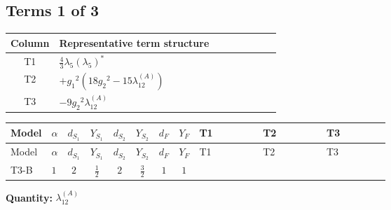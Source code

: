 \documentclass[8pt]{article}
\begin{document}
\begin{landscape}
\subsection*{Terms 1 of 3}
\begin{center}
\begin{tabular}{@{}c >{\raggedright\arraybackslash}p{0.82\linewidth}@{}}
\toprule
Column & Representative term structure \\
\midrule
T1 & \(\displaystyle \frac{4}{3} {\lambda_5} \left({\lambda_5}\right)^{*}\) \\
\midrule
T2 & \(\displaystyle +{g_1}^2 \left(18 {g_2}^2-15 {\lambda_{12}^{(A)}}\right)\) \\
\midrule
T3 & \(\displaystyle -9 {g_2}^2 {\lambda_{12}^{(A)}}\) \\
\midrule
\bottomrule
\end{tabular}
\end{center}
\smallskip
\tiny
\begin{longtable}{@{}llcccccc >{\raggedright\arraybackslash}p{0.21\linewidth} >{\raggedright\arraybackslash}p{0.21\linewidth} >{\raggedright\arraybackslash}p{0.21\linewidth}@{}}
\toprule
Model & $\alpha$ & $d_{S_1}$ & $Y_{S_1}$ & $d_{S_2}$ & $Y_{S_2}$ & $d_F$ & $Y_F$ & T1 & T2 & T3 \\
\midrule
\endfirsthead
\toprule
Model & $\alpha$ & $d_{S_1}$ & $Y_{S_1}$ & $d_{S_2}$ & $Y_{S_2}$ & $d_F$ & $Y_F$ & T1 & T2 & T3 \\
\midrule
\endhead
T3-B & $1$ & $2$ & $\frac{1}{2}$ & $2$ & $\frac{3}{2}$ & $1$ & $1$ & \scriptsize\adjustbox{max width=\linewidth}{$\begin{gathered} \frac{4}{3} {\lambda_5} \left({\lambda_5}\right)^{*}\end{gathered}$} & \scriptsize\adjustbox{max width=\linewidth}{$\begin{gathered} +{g_1}^2 \left(18 {g_2}^2-15 {\lambda_{12}^{(A)}}\right)\end{gathered}$} & \scriptsize\adjustbox{max width=\linewidth}{$\begin{gathered} -9 {g_2}^2 {\lambda_{12}^{(A)}}\end{gathered}$} \\
\midrule
\bottomrule
\end{longtable}
\clearpage
\noindent\textbf{Quantity: }$\lambda_{12}^{(A)}$\par\smallskip

\end{landscape}
\end{document}
